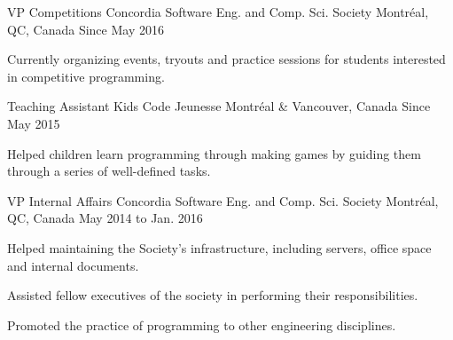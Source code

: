 

\begin{cventries}


  \cventry
    {VP Competitions} %
    {Concordia Software Eng. and Comp. Sci. Society} %
    {Montréal, QC, Canada} %
    {Since May 2016} %
    {
      \begin{cvitems} %
        \item {Currently organizing events, tryouts and practice sessions for students interested in competitive programming.}
      \end{cvitems}
    }
    \vspace{2.0mm}
  \cventry
    {Teaching Assistant} %
    {Kids Code Jeunesse} %
    {Montréal \& Vancouver, Canada} %
    {Since May 2015} %
    {
      \begin{cvitems} %
        \item {Helped children learn programming through making games by guiding them through a series of well-defined tasks.}
        \\
      \end{cvitems}
    }
    \vspace{2.0mm}

  \cventry
    {VP Internal Affairs} %
    {Concordia Software Eng. and Comp. Sci. Society} %
    {Montréal, QC, Canada} %
    {May 2014 to Jan. 2016} %
    {
      \begin{cvitems} %
        \item {Helped maintaining the Society’s infrastructure, including servers, office space and internal documents.}
        \item {Assisted fellow executives of the society in performing their responsibilities.}
        \item {Promoted the practice of programming to other engineering disciplines.}
      \end{cvitems}
    }
    \vspace{2.0mm}


\end{cventries}
